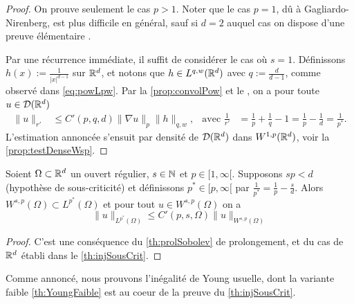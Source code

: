\begin{proof}
On prouve seulement le cas $p>1$. Noter que le cas $p=1$, dû à Gagliardo-Nirenberg, est plus difficile en général, sauf si $d=2$ auquel cas on dispose d'une preuve élémentaire \cite{desvilettes2015analyse}. 

Par une récurrence immédiate, il suffit de considérer le cas où $s=1$. 
Définissons $h(x) := \frac 1 {|x|^{d-1}}$ sur $\mathbb{R}^d$, et notons que $h \in L^{q,w}(\mathbb{R}^d)$ avec $q := \frac d {d-1}$, comme observé dans \eqref{eq:powLpw}. 
Par la \cref{prop:convolPow} et le , on a pour toute $u \in \mathcal{D}(\mathbb{R}^d)$
\begin{align*}
	\|u\|_{r'} &\leq C'(p,q,d) \|\nabla u\|_p \| h \|_{q,w},  & \text{avec } \frac 1 {r'} &= \frac 1 p + \frac 1 q -1 = \frac 1 p -\frac 1 d = \frac 1 {p^*}.
\end{align*}
L'estimation annoncée s'ensuit par densité de $\mathcal{D}(\mathbb{R}^d)$ dans $W^{1,p}(\mathbb{R}^d)$, voir la \cref{prop:testDenseWsp}.
\end{proof}


\begin{corollary}
\label{corol:injSousCritOm}
%
	Soient $\Omega\subset \mathbb{R}^d$ un ouvert régulier, $s\in \mathbb{N}$ et $p \in [1,\infty[$. Supposons $s p <d$ (hypothèse de sous-criticité) et définissons $p^* \in [p,\infty[$ par $\frac 1 {p^*} = \frac 1 p - \frac s d$.
	Alors $W^{s,p}(\Omega) \subset L^{p^*}(\Omega)$ et pour tout $u \in W^{s,p}(\Omega)$ on a 
	\begin{equation*}
		\|u\|_{L^{p^*}(\Omega)} \leq C'(p,s,\Omega) \|u\|_{W^{s,p}(\Omega)} %
	\end{equation*}
\end{corollary}

\begin{proof}
	C'est une conséquence du \cref{th:prolSobolev} de prolongement, et du cas de $\mathbb{R}^d$ établi dans le \cref{th:injSousCrit}.
\end{proof}

Comme annoncé, nous prouvons l'inégalité de Young usuelle, dont la variante faible \cref{th:YoungFaible} est au coeur de la preuve du \cref{th:injSousCrit}.


